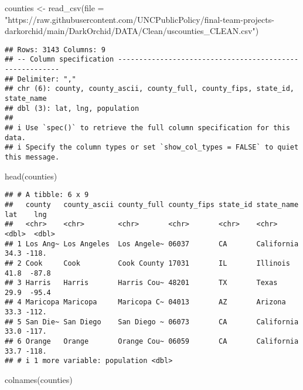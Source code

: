 \documentclass[
]{article}
\newenvironment{Shaded}{\begin{snugshade}}{\end{snugshade}}
\newcommand{\AttributeTok}[1]{\textcolor[rgb]{0.77,0.63,0.00}{#1}}
\newcommand{\FunctionTok}[1]{\textcolor[rgb]{0.00,0.00,0.00}{#1}}
\newcommand{\NormalTok}[1]{#1}
\newcommand{\OtherTok}[1]{\textcolor[rgb]{0.56,0.35,0.01}{#1}}
\newcommand{\StringTok}[1]{\textcolor[rgb]{0.31,0.60,0.02}{#1}}
\begin{document}
\begin{Shaded}
\begin{Highlighting}[]
\NormalTok{counties }\OtherTok{\textless{}{-}} \FunctionTok{read\_csv}\NormalTok{(}\AttributeTok{file =} \StringTok{"https://raw.githubusercontent.com/UNCPublicPolicy/final{-}team{-}projects{-}darkorchid/main/DarkOrchid/DATA/Clean/uscounties\_CLEAN.csv"}\NormalTok{)}
\end{Highlighting}
\end{Shaded}

\begin{verbatim}
## Rows: 3143 Columns: 9
## -- Column specification --------------------------------------------------------
## Delimiter: ","
## chr (6): county, county_ascii, county_full, county_fips, state_id, state_name
## dbl (3): lat, lng, population
## 
## i Use `spec()` to retrieve the full column specification for this data.
## i Specify the column types or set `show_col_types = FALSE` to quiet this message.
\end{verbatim}

\begin{Shaded}
\begin{Highlighting}[]
\FunctionTok{head}\NormalTok{(counties)}
\end{Highlighting}
\end{Shaded}

\begin{verbatim}
## # A tibble: 6 x 9
##   county   county_ascii county_full county_fips state_id state_name   lat    lng
##   <chr>    <chr>        <chr>       <chr>       <chr>    <chr>      <dbl>  <dbl>
## 1 Los Ang~ Los Angeles  Los Angele~ 06037       CA       California  34.3 -118. 
## 2 Cook     Cook         Cook County 17031       IL       Illinois    41.8  -87.8
## 3 Harris   Harris       Harris Cou~ 48201       TX       Texas       29.9  -95.4
## 4 Maricopa Maricopa     Maricopa C~ 04013       AZ       Arizona     33.3 -112. 
## 5 San Die~ San Diego    San Diego ~ 06073       CA       California  33.0 -117. 
## 6 Orange   Orange       Orange Cou~ 06059       CA       California  33.7 -118. 
## # i 1 more variable: population <dbl>
\end{verbatim}

\begin{Shaded}
\begin{Highlighting}[]
\FunctionTok{colnames}\NormalTok{(counties)}
\end{Highlighting}
\end{Shaded}
\end{document}
